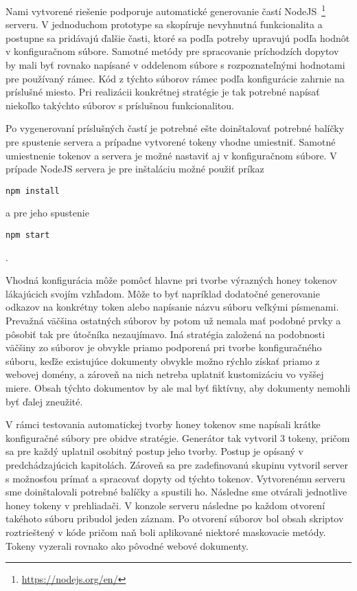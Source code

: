 \documentclass[conference, 11pt,slovak,a4paper,twoside]{IEEEtran}
\begin{document}
Nami vytvorené riešenie podporuje automatické generovanie častí NodeJS~\footnote{\url{https://nodejs.org/en/}} serveru. V jednoduchom prototype sa skopíruje nevyhnutná funkcionalita a postupne sa pridávajú ďalšie časti, ktoré sa podľa potreby upravujú podľa hodnôt v konfiguračnom súbore. Samotné metódy pre spracovanie príchodzích dopytov by mali byť rovnako napísané v oddelenom súbore s rozpoznateľnými hodnotami pre používaný rámec. Kód z týchto súborov rámec podľa konfigurácie zahrnie na príslušné miesto. Pri realizácii konkrétnej stratégie je tak potrebné napísať niekoľko takýchto súborov s príslušnou funkcionalitou. 

Po vygenerovaní príslušných častí je potrebné ešte doinštalovať potrebné balíčky pre spustenie servera a prípadne vytvorené tokeny vhodne umiestniť. Samotné umiestnenie tokenov a servera je možné nastaviť aj v konfiguračnom súbore. V prípade NodeJS servera je pre inštaláciu možné použiť príkaz 

\begin{lstlisting}
npm install
\end{lstlisting} 

a pre jeho spustenie 

\begin{lstlisting}
npm start
\end{lstlisting}.

Vhodná konfigurácia môže pomôcť hlavne pri tvorbe výrazných honey tokenov lákajúcich svojím vzhľadom. Môže to byť napríklad dodatočné generovanie odkazov na konkrétny token alebo napísanie názvu súboru veľkými písmenami. Prevažná väčšina ostatných súborov by potom už nemala mať podobné prvky a pôsobiť tak pre útočníka nezaujímavo. Iná stratégia založená na podobnosti väčšiny zo súborov je obvykle priamo podporená pri tvorbe konfiguračného súboru, keďže existujúce dokumenty obvykle možno rýchlo získať priamo z webovej domény, a zároveň na nich netreba uplatniť kustomizáciu vo vyššej miere. Obsah týchto dokumentov by ale mal byť fiktívny, aby dokumenty nemohli byť ďalej zneužité.

V rámci testovania automatickej tvorby honey tokenov sme napísali krátke konfiguračné súbory pre obidve stratégie. Generátor tak vytvoril 3 tokeny, pričom sa pre každý uplatnil osobitný postup jeho tvorby. Postup je opísaný v predchádzajúcich kapitolách. Zároveň sa pre zadefinovanú skupinu vytvoril server s možnosťou prímať a spracovať dopyty od týchto tokenov. Vytvorenému serveru sme doinštalovali potrebné balíčky a spustili ho. Následne sme otvárali jednotlive honey tokeny v prehliadači. V konzole serveru následne po každom otvorení takéhoto súboru pribudol jeden záznam. Po otvorení súborov bol obsah skriptov roztrieštený v kóde pričom naň boli aplikované niektoré maskovacie metódy. Tokeny vyzerali rovnako ako pôvodné webové dokumenty.  
\end{document}
